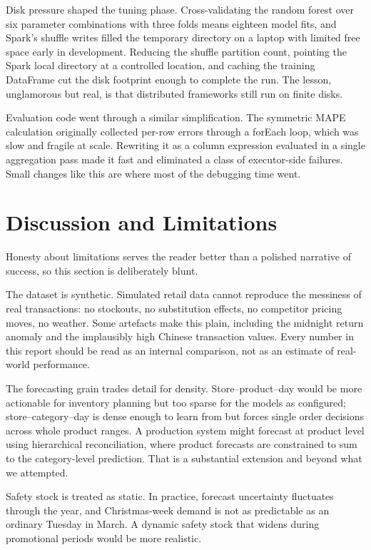 \documentclass[11pt,a4paper]{article}
\begin{document}
Disk pressure shaped the tuning phase. Cross-validating the random forest over six parameter combinations with three folds means eighteen model fits, and Spark's shuffle writes filled the temporary directory on a laptop with limited free space early in development. Reducing the shuffle partition count, pointing the Spark local directory at a controlled location, and caching the training DataFrame cut the disk footprint enough to complete the run. The lesson, unglamorous but real, is that distributed frameworks still run on finite disks.

Evaluation code went through a similar simplification. The symmetric MAPE calculation originally collected per-row errors through a forEach loop, which was slow and fragile at scale. Rewriting it as a column expression evaluated in a single aggregation pass made it fast and eliminated a class of executor-side failures. Small changes like this are where most of the debugging time went.

\section{Discussion and Limitations}\label{sec:discussion}

Honesty about limitations serves the reader better than a polished narrative of success, so this section is deliberately blunt.

The dataset is synthetic. Simulated retail data cannot reproduce the messiness of real transactions: no stockouts, no substitution effects, no competitor pricing moves, no weather. Some artefacts make this plain, including the midnight return anomaly and the implausibly high Chinese transaction values. Every number in this report should be read as an internal comparison, not as an estimate of real-world performance.

The forecasting grain trades detail for density. Store--product--day would be more actionable for inventory planning but too sparse for the models as configured; store--category--day is dense enough to learn from but forces single order decisions across whole product ranges. A production system might forecast at product level using hierarchical reconciliation, where product forecasts are constrained to sum to the category-level prediction. That is a substantial extension and beyond what we attempted.

Safety stock is treated as static. In practice, forecast uncertainty fluctuates through the year, and Christmas-week demand is not as predictable as an ordinary Tuesday in March. A dynamic safety stock that widens during promotional periods would be more realistic.
\end{document}
